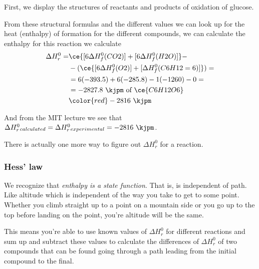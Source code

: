 \documentclass[../mit-general-chemistry.tex]{subfiles}
\begin{document}
First, we display the structures of reactants and products of
oxidation of glucose.
\begin{center}
\end{center}

\hspace*{\fill}
\hfill
{}
\hfill
{}
\hspace*{\fill}

From these structural formulas and the different values we can look up
for the heat (enthalpy) of formation for the different compounds, we
can calculate the enthalpy for this reaction we calculate
\begin{align*}
  \Delta H_r^0 = &\ce{[6\Delta H_f^0(CO2)] + [6\Delta H_f^0(H2O)]} - \\
  &- (\ce{[6\Delta H_f^0(O2)] + [\Delta H_f^0(C6H12=6)]}) = \\
  &= 6(-393.5) + 6(-285.8) - 1(-1260) - 0 = \\ &
  = -2827.8~\kjpm~\text{of}~\ce{C6H12O6} \\
  &{\color{red} -2816~\kjpm}
\end{align*}

And from the MIT lecture we see that $\Delta H_r^0{}_{calculated} =
\Delta H_r^0{}_{experimental} = -2816~\kjpm$.


There is actually one more way to figure out $\Delta H_r^0$ for a
reaction.



\subsubsection{Hess' law}



We recognize that {\em enthalpy is a state function}. That is,
\enthalpy is independent of path. Like altitude which is independent
of the way you take to get to some point. Whether you climb straight
up to a point on a mountain side or you go up to the top before
landing on the point, you're altitude will be the same.

This means you're able to use known values of $\Delta H_r^0$ for
different reactions and sum up and subtract these values to calculate
the differences of $\Delta H_r^0$ of two compounds that can be found
going through a path leading from the initial compound to the final.
\end{document}
